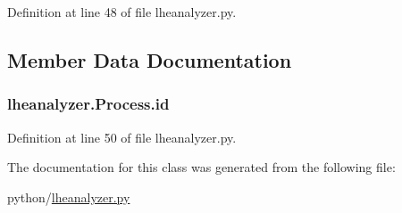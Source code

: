 Definition at line 48 of file lheanalyzer.\-py.



\subsection{Member Data Documentation}
\subsubsection[{id}]{\setlength{\rightskip}{0pt plus 5cm}lheanalyzer.\-Process.\-id}\label{classlheanalyzer_1_1Process_aba04b3f3ba305d9ff2dab3dacb65732f}


Definition at line 50 of file lheanalyzer.\-py.



The documentation for this class was generated from the following file\-:\begin{DoxyCompactItemize}
\item 
python/\hyperlink{lheanalyzer_8py}{lheanalyzer.\-py}\end{DoxyCompactItemize}
